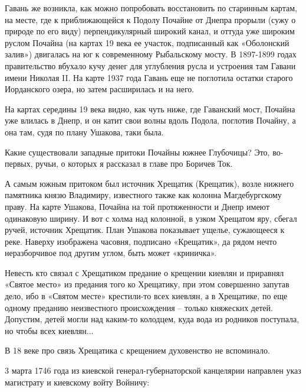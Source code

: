 Гавань же возникла, как можно попробовать восстановить по старинным картам, на месте, где к приближающейся к Подолу Почайне от Днепра прорыли (сужу о природе по его виду) перпендикулярный широкий канал, и оттуда уже широким руслом Почайна (на картах 19 века ее участок, подписанный как «Оболонский залив») двигалась на юг к современному Рыбальскому мосту. В 1897-1899 годах правительство вбухало кучу денег для углубления русла и устроения там Гавани имени Николая II. На карте 1937 года Гавань еще не поглотила остатки старого Иорданского озера, но затем расширилась и на него.

На картах середины 19 века видно, как чуть ниже, где Гаванский мост, Почайна уже влилась в Днепр, и он катит свои волны вдоль Подола, поглотив Почайну, а она там, судя по плану Ушакова, таки была.

Какие существовали западные притоки
Почайны южнее Глубочицы? Это, во-первых, ручьи, о которых я рассказал в главе про Боричев Ток.

А самым южным притоком был источник Хрещатик (Крещатик), возле нижнего памятника князю Владимиру, известного также как колонна Магдебургскому праву. На карте Ушакова, Почайна на той протяженности и Днепр имеют одинаковую ширину. И вот с холма над колонной, в узком Хрещатом яру, сбегал ручей, источник Хрещатик. План Ушакова показывает ущелье, сужающееся к реке. Наверху изображена часовня, подписано «Крещатик», да рядом нечто неразборчивое под другим углом, быть может «криничка».

Невесть кто связал с Хрещатиком предание о крещении киевлян и приравнял «Святое место» из предания того ко Хрещатику, при этом совершенно запутав дело, ибо в «Святом месте» крестили-то всех киевлян, а в Хрещатике, по еще одному преданию неизвестного происхождения – только княжеских детей. Допустим, детей могли над каким-то колодцем, куда вода из родников поступала, но чтобы всех киевлян...

В 18 веке про связь Хрещатика с крещением духовенство не вспоминало. 

3 марта 1746 года из киевской генерал-губернатор\-ской канцелярии направлен указ магистрату и киевскому войту Войничу:

